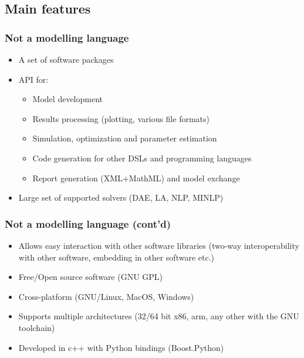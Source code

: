 \documentclass{beamer}
\begin{document}
\subsection{Main features}
\begin{frame}
\frametitle{Not a modelling language}
\begin{block}{}
\begin{itemize}
  \item A set of software packages
  \item API for:
  \begin{itemize}
    \item Model development
    \item Results processing (plotting, various file formats)
    \item Simulation, optimization and parameter estimation
    \item Code generation for other DSLs and programming languages
    \item Report generation (XML+MathML) and model exchange
  \end{itemize}
  \item Large set of supported solvers (DAE, LA, NLP, MINLP)
\end{itemize}
\end{block}
\end{frame}

\begin{frame}
\frametitle{Not a modelling language (cont'd)}
\begin{block}{}
\begin{itemize}
  \item Allows easy interaction with other software libraries 
        (two-way interoperability with other software, embedding in other software etc.)
  \item Free/Open source software (GNU GPL)
  \item Cross-platform (GNU/Linux, MacOS, Windows)
  \item Supports multiple architectures (32/64 bit x86, arm, any other with the GNU toolchain)
  \item Developed in c++ with Python bindings (Boost.Python)
\end{itemize}
\end{block}
\end{frame}
\end{document}
